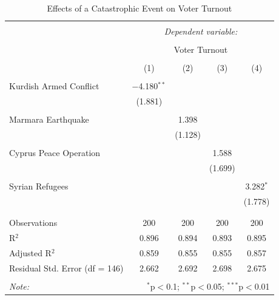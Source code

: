 \documentclass[12pt]{article}
\begin{document}
\begin{table}[!htbp] \centering 
  \caption{Effects of a Catastrophic Event on Voter Turnout} 
  \label{} 
\begin{tabular}{@{\extracolsep{5pt}}lcccc} 
\\[-1.8ex]\hline 
\hline \\[-1.8ex] 
 & \multicolumn{4}{c}{\textit{Dependent variable:}} \\ 
\cline{2-5} 
\\[-1.8ex] & \multicolumn{4}{c}{Voter Turnout} \\ 
\\[-1.8ex] & (1) & (2) & (3) & (4)\\ 
\hline \\[-1.8ex] 
 Kurdish Armed Conflict & $-$4.180$^{**}$ &  &  &  \\ 
  & (1.881) &  &  &  \\ 
  & & & & \\ 
 Marmara Earthquake &  & 1.398 &  &  \\ 
  &  & (1.128) &  &  \\ 
  & & & & \\ 
 Cyprus Peace Operation &  &  & 1.588 &  \\ 
  &  &  & (1.699) &  \\ 
  & & & & \\ 
 Syrian Refugees &  &  &  & 3.282$^{*}$ \\ 
  &  &  &  & (1.778) \\ 
  & & & & \\ 
\hline \\[-1.8ex] 
Observations & 200 & 200 & 200 & 200 \\ 
R$^{2}$ & 0.896 & 0.894 & 0.893 & 0.895 \\ 
Adjusted R$^{2}$ & 0.859 & 0.855 & 0.855 & 0.857 \\ 
Residual Std. Error (df = 146) & 2.662 & 2.692 & 2.698 & 2.675 \\ 
\hline 
\hline \\[-1.8ex] 
\textit{Note:}  & \multicolumn{4}{r}{$^{*}$p$<$0.1; $^{**}$p$<$0.05; $^{***}$p$<$0.01} \\ 
\end{tabular} 
\end{table} 
\end{document}
